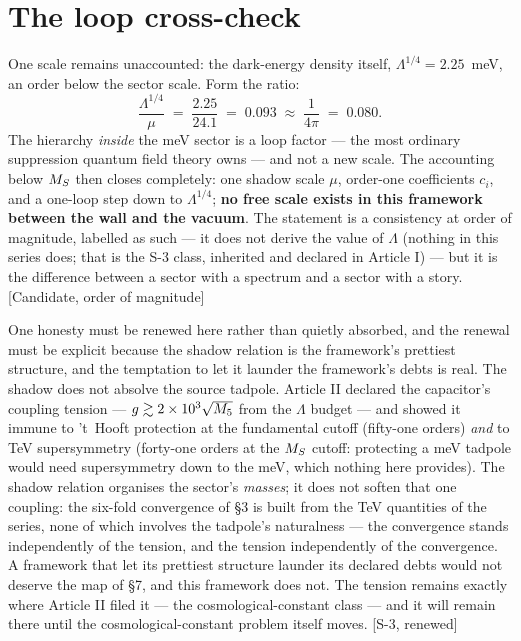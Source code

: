 \section{The loop cross-check}
One scale remains unaccounted: the dark-energy density itself, $\Lambda^{1/4}=2.25$~meV, an order below the sector scale. Form the ratio:
\begin{equation}
\frac{\Lambda^{1/4}}{\mu}\;=\;\frac{2.25}{24.1}\;=\;0.093\;\approx\;\frac{1}{4\pi}\;=\;0.080 .
\end{equation}
The hierarchy \emph{inside} the meV sector is a loop factor --- the most ordinary suppression quantum field theory owns --- and not a new scale. The accounting below $M_S$ then closes completely: one shadow scale $\mu$, order-one coefficients $c_{i}$, and a one-loop step down to $\Lambda^{1/4}$; \textbf{no free scale exists in this framework between the wall and the vacuum}. The statement is a consistency at order of magnitude, labelled as such --- it does not derive the value of $\Lambda$ (nothing in this series does; that is the S-3 class, inherited and declared in Article I) --- but it is the difference between a sector with a spectrum and a sector with a story. [Candidate, order of magnitude]

One honesty must be renewed here rather than quietly absorbed, and the renewal must be explicit because the shadow relation is the framework's prettiest structure, and the temptation to let it launder the framework's debts is real. The shadow does not absolve the source tadpole. Article II declared the capacitor's coupling tension --- $g\gtrsim2\times10^{3}\sqrt{M_5}$ from the $\Lambda$ budget --- and showed it immune to 't~Hooft protection at the fundamental cutoff (fifty-one orders) \emph{and} to TeV supersymmetry (forty-one orders at the $M_S$ cutoff: protecting a meV tadpole would need supersymmetry down to the meV, which nothing here provides). The shadow relation organises the sector's \emph{masses}; it does not soften that one coupling: the six-fold convergence of \S3 is built from the TeV quantities of the series, none of which involves the tadpole's naturalness --- the convergence stands independently of the tension, and the tension independently of the convergence. A framework that let its prettiest structure launder its declared debts would not deserve the map of \S7, and this framework does not. The tension remains exactly where Article II filed it --- the cosmological-constant class --- and it will remain there until the cosmological-constant problem itself moves. [S-3, renewed]

